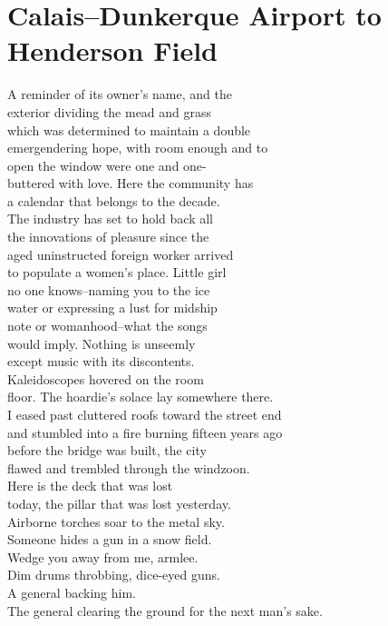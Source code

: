 \documentclass[smalldemyvopaper,11pt,twoside,onecolumn,openright,extrafontsizes]{memoir}
\begin{document}
\chapter{Calais–Dunkerque Airport to Henderson Field}
A reminder of its owner's name, and the
\\exterior dividing the mead and grass
\\which was determined to maintain a double
\\emergendering hope, with room enough and to
\\open the window were one and one-
\\buttered with love. Here the community has
\\a calendar that belongs to the decade.
\\The industry has set to hold back all
\\the innovations of pleasure since the
\\aged uninstructed foreign worker arrived
\\to populate a women's place. Little girl
\\no one knows--naming you to the ice
\\water or expressing a lust for midship
\\note or womanhood--what the songs
\\would imply. Nothing is unseemly
\\except music with its discontents.
\\Kaleidoscopes hovered on the room
\\floor. The hoardie's solace lay somewhere there.
\\I eased past cluttered roofs toward the street end
\\and stumbled into a fire burning fifteen years ago
\\before the bridge was built, the city
\\flawed and trembled through the windzoon.
\\Here is the deck that was lost
\\today, the pillar that was lost yesterday.
\\Airborne torches soar to the metal sky.
\\Someone hides a gun in a snow field.
\\Wedge you away from me, armlee.
\\Dim drums throbbing, dice-eyed guns.
\\A general backing him.
\\The general clearing the ground for the next man's sake.
\end{document}
